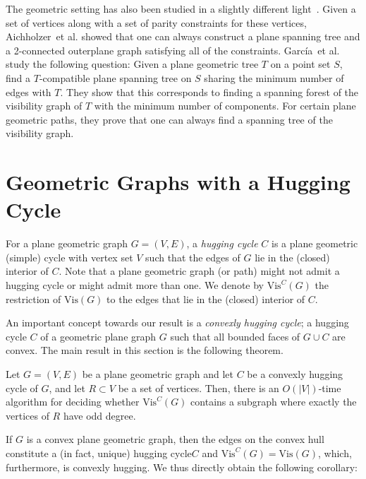 \documentclass[a4paper,runningheads,cleveref,thm-restate]{lipics-v2021}
\newcommand{\Vis}[1]{\ensuremath{\mathrm{Vis}(#1)}}
\newcommand{\VisHug}[2]{\ensuremath{\mathrm{Vis}^#1(#2)}}
\newcommand{\etal}{{et al.}\xspace}
\newcommand{\hug}{hugging cycle\xspace}
\newcommand{\HUG}{Hugging Cycle\xspace}
\begin{document}
 




The geometric setting has also been studied in a slightly different light~\cite{Aichholzer2014,Alvarez2015}. Given a set of vertices along with a set of parity constraints for these vertices, Aichholzer~\etal\cite{Aichholzer2014} showed that one can always construct a plane spanning tree and a 2-connected outerplane graph satisfying all of the constraints. 
Garc\'ia~\etal~\cite{GARCIA2014} study the following question: Given a plane geometric tree $T$ on a point set $S$, find a $T$-compatible plane spanning tree on $S$ sharing the minimum number of edges with $T$. 
They show that this corresponds to finding a spanning forest of the visibility graph of $T$ with the minimum number of components.
For certain plane geometric paths, they prove that one can always find a spanning tree of the visibility graph.

\section{Geometric Graphs with a \HUG}
\label{sec:convex}


{For a plane geometric graph $G=(V,E)$, a \emph{\hug} $C$ is a plane geometric (simple) cycle 
with vertex set $V$ 
such that the edges of $G$ lie in the (closed) interior of $C$. 
Note that a plane geometric graph (or path) might not admit a \hug or might admit more than one.
We denote by 
$\VisHug{C}{G}$ the restriction of $\Vis{G}$ to the edges that lie in the (closed) interior of $C$.} 
%

An important concept towards our result is a \emph{convexly hugging cycle}; a hugging cycle $C$ of a geometric plane graph $G$ such that all bounded faces of $G\cup C$ are convex.
%
The main result in this section is the following theorem.  

\begin{theorem}
	\label{thm:HUG}
	Let $G=(V,E)$ be a plane geometric graph and let $C$ be a convexly \hug{} of $G$, and let $R\subset V$ be a set of vertices. Then, there is an $O(|V|)$-time algorithm for deciding whether $\VisHug{C}{G}$ contains a subgraph where exactly the vertices of $R$ have odd degree.
\end{theorem}

{If $G$ is a convex plane geometric graph, then the edges on the convex hull constitute a (in fact, unique) \hug $C$ and $\VisHug{C}{G}=\Vis{G}$, which, furthermore, is convexly hugging. We thus directly obtain the following corollary:}
\end{document}
